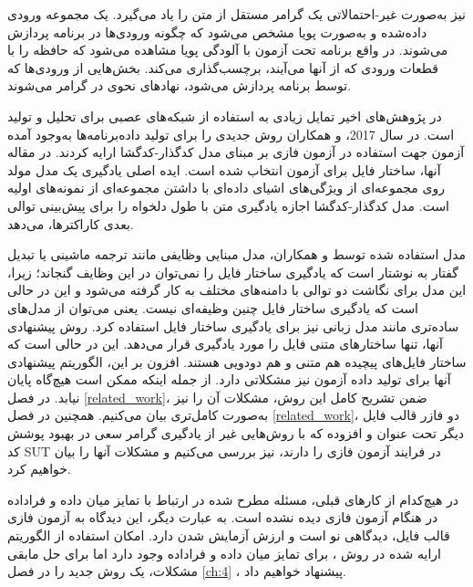  
  \cite{Hoschele:2016:MIG:2970276.2970321}
  نیز به‌صورت غیر-احتمالاتی یک گرامر مستقل از متن را یاد می‌گیرد. یک مجموعه ورودی داده‌شده و به‌صورت پویا مشخص می‌شود که چگونه ورودی‌ها در برنامه پردازش می‌شوند. در واقع برنامه تحت آزمون با آلودگی پویا  مشاهده می‌شود که حافظه را با قطعات ورودی که از آنها می‌آیند، برچسب‌گذاری می‌کند. بخش‌هایی از ورودی‌ها که توسط برنامه پردازش می‌شود، نهادهای نحوی در گرامر می‌شوند.  

در پژوهش‌های اخیر تمایل زیادی به استفاده از شبکه‌های عصبی برای تحلیل و تولید برنامه‌ها به‌وجود آمده‎‌است. در سال 2017، 
 \cite{Godefroid:2017:LML:3155562.3155573}
و همکاران روش جدیدی را برای تولید داده آزمون جهت استفاده در آزمون فازی بر مبنای مدل کدگذار-کدگشا
 \cite{NIPS2014_5346, DBLP:journals/corr/ChoMGBSB14}
 ارایه کردند. در مقاله آنها، ساختار فایل 
برای آزمون انتخاب شده است. ایده اصلی یادگیری یک مدل مولد روی مجموعه‌ای از ویژگی‌های اشیای داده‌ای
  با داشتن مجموعه‌ای از نمونه‌های اولیه است. مدل کدگذار-کدگشا اجازه یادگیری متن با طول دلخواه را برای پیش‌بینی توالی بعدی کاراکترها، می‌دهد. 
  
  مدل استفاده شده توسط 
و همکاران، مدل مبنایی وظایفی مانند ترجمه ماشینی یا تبدیل گفتار به نوشتار است که یادگیری ساختار فایل را نمی‌توان در این وظایف گنجاند؛ زیرا، این مدل‌ برای نگاشت دو توالی با دامنه‌های مختلف به کار گرفته می‌شود و این در حالی است که یادگیری ساختار فایل چنین وظیفه‌ای نیست. یعنی می‌توان از مدل‌های ساده‌تری مانند مدل زبانی نیز برای یادگیری ساختار فایل استفاده کرد. روش پیشنهادی آنها، تنها ساختارهای متنی فایل را مورد یادگیری قرار می‌دهد. این در حالی است که ساختار فایل‌های پیچیده هم متنی و هم دودویی هستند. افزون بر این، الگوریتم پیشنهادی آنها برای تولید داده آزمون نیز مشکلاتی دارد. از جمله اینکه ممکن است هیچ‌گاه پایان نیابد. در فصل \ref{related_work}، ضمن تشریح کامل این روش، مشکلات آن را نیز به‌صورت کامل‌تری بیان می‌کنیم. همچنین در فصل \ref{related_work}، دو فازر قالب فایل دیگر تحت عنوان
  \cite{Zalewsky2013}
  و
افزوده \cite{DBLP:journals/corr/abs-1711-04596}
 که با روش‌هایی غیر از یادگیری گرامر سعی در بهبود پوشش کد 
\gls{SUT}
در فرایند آزمون فازی را دارند، نیز بررسی می‌کنیم و مشکلات آنها را بیان خواهیم کرد.

در هیچ‌کدام از کارهای قبلی، مسئله مطرح شده در ارتباط با تمایز میان داده و فراداده در هنگام آزمون فازی دیده نشده است. به عبارت دیگر، این دیدگاه به آزمون فازی قالب فایل، دیدگاهی نو است و ارزش آزمایش شدن دارد.    امکان استفاده از الگوریتم ارایه شده در روش \cite{Godefroid:2017:LML:3155562.3155573}، برای تمایز میان داده و فراداده وجود دارد اما برای حل مابقی مشکلات، یک روش جدید را در فصل
\ref{ch:4}
، پیشنهاد خواهیم داد. 


